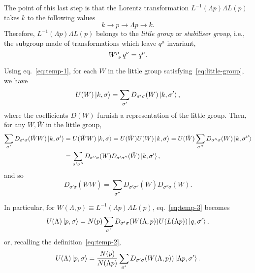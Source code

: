  The point of this last step is that the Lorentz transformation $L^{-1}(\Lambda p) \Lambda L(p)$ takes $k$ to the following values
\begin{equation}
    k \to p \to \Lambda p \to k .
\end{equation}
Therefore, $L^{-1}(\Lambda p) \Lambda L(p)$ belongs to the \emph{little  group} or \emph{stabiliser group}, i.e., the subgroup made of transformations which leave $q^\mu$ invariant,
\begin{equation}\label{eq:little-group}
    \tensor{W}{^\mu_\nu} q^\nu = q^\mu .
\end{equation}

Using eq.~\eqref{eq:temp-1}, for each $W$ in the little group satisfying~\eqref{eq:little-group}, we have
\begin{equation}
    U(W) \ket{k,\sigma} = \sum_{\sigma'} D_{\sigma'\sigma}(W) \ket{k,\sigma'} ,
\end{equation}
where the coefficients $D(W)$ furnish a representation of the little group. Then, for any $W,\bar{W}$ in the little group,
\begin{equation*}
\begin{split}
    \sum_{\sigma'} D_{\sigma'\sigma} (\bar{W}W) \ket{k,\sigma'} &= U(\bar{W}W)  \ket{k,\sigma} = U(\bar{W}) U(W) \ket{k,\sigma} = U(\bar{W}) \sum_{\sigma''} D_{\sigma''\sigma}(W) \ket{k,\sigma''} \\ &= \sum_{\sigma' \sigma''} D_{\sigma''\sigma}(W) D_{\sigma'\sigma''}(\bar{W}) \ket{k,\sigma'} ,
\end{split}
\end{equation*}
and so
\begin{equation}
    D_{\sigma'\sigma}(\bar{W}W) = \sum_{\sigma''} D_{\sigma'\sigma''} (\bar{W}) D_{\sigma'' \sigma}(W) .
\end{equation}

In particular, for $W(\Lambda,p) \equiv L^{-1}(\Lambda p) \Lambda L(p)$, eq.~\eqref{eq:temp-3} becomes
\begin{equation}
   U(\Lambda) \ket{p,\sigma} = N(p) \sum_{\sigma'} D_{\sigma'\sigma}(W(\Lambda,p))U(L(\Lambda p)) \ket{q,\sigma'} ,
\end{equation}
or, recalling the definition~\eqref{eq:temp-2},
\begin{equation}\label{eq:induced-representation}
    U(\Lambda) \ket{p,\sigma} = \frac{N(p)}{N(\Lambda p)} \sum_{\sigma'} D_{\sigma'\sigma} (W(\Lambda, p)) \ket{\Lambda p, \sigma'} .
\end{equation}

